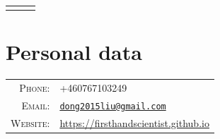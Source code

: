 \documentclass[a4paper,10pt]{article}
\begin{document}
\pagestyle{empty}


\begin{center}
  \begin{tabular}{lcr}
    \par{\centering{\Huge Dong Liu, Ph.D.}\bigskip\par} & & %
  \end{tabular}
\end{center}

\section{Personal data}

\begin{tabular}{rl}
  \textsc{Phone:} & +460767103249 \\
  \textsc{Email:} & \href{mailto:dong2015liu@gmail.com}{\nolinkurl{dong2015liu@gmail.com}}\\
  \textsc{Website:} & \href{https://firsthandscientist.github.io}{https://firsthandscientist.github.io}\\
\end{tabular}

\end{document}
